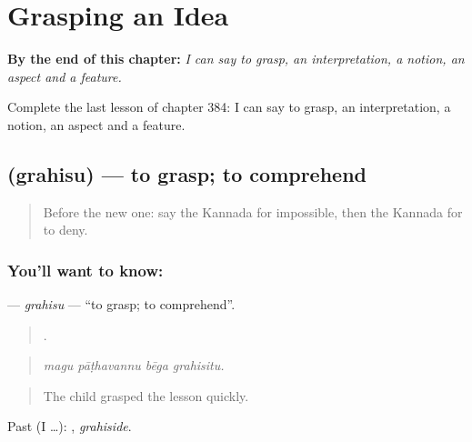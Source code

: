 
\chapter{Grasping an Idea}
\label{ch:ka-grasping-an-idea}

\begin{chapteropening}
\textbf{By the end of this chapter:} \emph{I can say to grasp, an interpretation, a notion, an aspect and a feature.}

Complete the last lesson of chapter 384: I can say to grasp, an interpretation, a notion, an aspect and a feature.
\end{chapteropening}

\section[\texorpdfstring{\kn{ಗ್ರಹಿಸು} (grahisu)}{ಗ್ರಹಿಸು (grahisu)}]{ (grahisu) — to grasp; to comprehend}

\label{lesson:KA-C384-grahisu}



\begin{quote}
Before the new one: say the Kannada for impossible, then the Kannada for to deny.
\end{quote}

\subsection*{You'll want to know: }
\textbf{} — \emph{grahisu} — \textquotedblleft{}to grasp; to comprehend\textquotedblright{}.

\begin{quote}
   .
\end{quote}

\begin{quote}
\emph{magu pāṭhavannu bēga grahisitu.}
\end{quote}

\begin{quote}
The child grasped the lesson quickly.
\end{quote}

Past (I …): , \emph{grahiside}.

